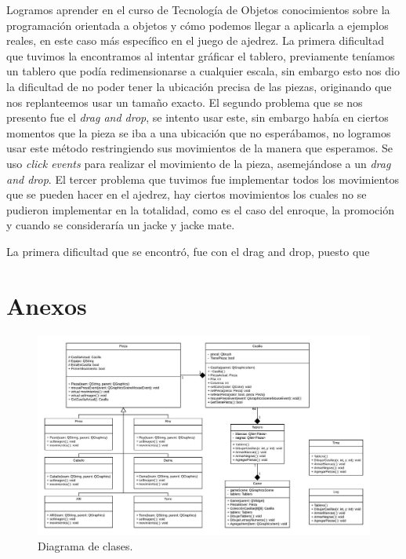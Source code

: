 \documentclass[conference]{IEEEtran}
\newcommand\tab[1][1cm]{\hspace*{#1}}
\begin{document}
    \newline
    \newline
    \tab[0.55cm]Logramos aprender en el curso de Tecnología de Objetos conocimientos sobre la programación orientada a objetos y cómo podemos llegar a aplicarla a ejemplos reales, en este caso más específico en el juego de ajedrez.
    \newline
    \newline
    \tab[0.55cm]La primera dificultad que tuvimos la encontramos al intentar gráficar el tablero, previamente teníamos un tablero que podía redimensionarse a cualquier escala, sin embargo esto nos dio la dificultad de no poder tener la ubicación precisa de las piezas, originando que nos replanteemos usar un tamaño exacto.
    \newline
    \newline
    \tab[0.55cm]El segundo problema que se nos presento fue el \textit{drag and drop}, se intento usar este, sin embargo había en ciertos momentos que la pieza se iba a una ubicación que no esperábamos, no logramos usar este método restringiendo sus movimientos de la manera que esperamos. Se uso \textit{click events} para realizar el movimiento de la pieza, asemejándose a un \textit{drag and drop}.
    \newline
    \newline    
    \tab[0.55cm]El tercer problema que tuvimos fue implementar todos los movimientos que se pueden hacer en el ajedrez, hay ciertos movimientos los cuales no se pudieron implementar en la totalidad, como es el caso del enroque, la promoción y cuando se consideraría un jacke y jacke mate.
    
    
    
La primera dificultad que se encontró, fue con el drag and drop, puesto que 

\AtNextBibliography{\small}\printbibliography

\section{Anexos}

\clearpage
\newpage

\begin{figure}
  \includegraphics[width=1\textwidth]{images/cc.jpeg}
  \caption{Diagrama de clases.}
  \label{fig:diagramaclases}

\end{figure}
\end{document}
